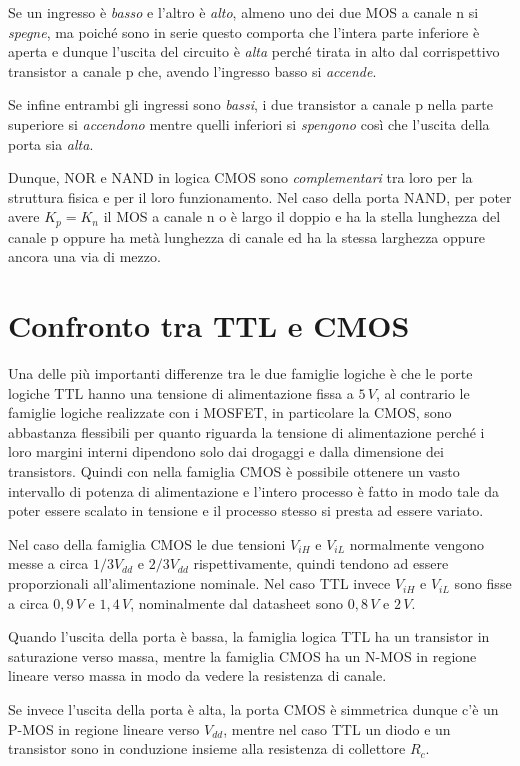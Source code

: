 \documentclass[12pt, a4paper]{report}
\begin{document}
Se un ingresso è \textit{basso} e l'altro è \textit{alto}, almeno uno dei due MOS a canale n si \textit{spegne}, ma poiché sono in serie questo comporta che l'intera parte inferiore è aperta e dunque l'uscita del circuito è \textit{alta} perché tirata in alto dal corrispettivo transistor a canale p che, avendo l'ingresso basso si \textit{accende}.

Se infine entrambi gli ingressi sono \textit{bassi}, i due transistor a canale p nella parte superiore si \textit{accendono} mentre quelli inferiori si \textit{spengono} così che l'uscita della porta sia \textit{alta}.

Dunque, NOR e NAND in logica CMOS sono \textit{complementari} tra loro per la struttura fisica e per il loro funzionamento. Nel caso della porta NAND, per poter avere $K_{p} = K_{n}$ il MOS a canale n o è largo il doppio e ha la stella lunghezza del canale p oppure ha metà lunghezza di canale ed ha la stessa larghezza oppure ancora una via di mezzo.

\section{Confronto tra TTL e CMOS}
Una delle più importanti differenze tra le due famiglie logiche è che le porte logiche TTL hanno una tensione di alimentazione fissa a $5\,V$, al contrario le famiglie logiche realizzate con i MOSFET, in particolare la CMOS, sono abbastanza flessibili per quanto riguarda la tensione di alimentazione perché i loro margini interni dipendono solo dai drogaggi e dalla dimensione dei transistors. Quindi con nella famiglia CMOS è possibile ottenere un vasto intervallo di potenza di alimentazione e l'intero processo è fatto in modo tale da poter essere scalato in tensione e il processo stesso si presta ad essere variato.

Nel caso della famiglia CMOS le due tensioni $V_{iH}$ e $V_{iL}$ normalmente vengono messe a circa $1/3V_{dd}$ e $2/3V_{dd}$ rispettivamente, quindi tendono ad essere proporzionali all'alimentazione nominale. Nel caso TTL invece $V_{iH}$ e $V_{iL}$ sono fisse a circa $0,9\,V$ e $1,4\,V$, nominalmente dal datasheet sono $0,8\,V$ e $2\,V$.

Quando l'uscita della porta è bassa, la famiglia logica TTL ha un transistor in saturazione verso massa, mentre la famiglia CMOS ha un N-MOS in regione lineare verso massa in modo da vedere la resistenza di canale.

Se invece l'uscita della porta è alta, la porta CMOS è simmetrica dunque c'è un P-MOS in regione lineare verso $V_{dd}$, mentre nel caso TTL un diodo e un transistor sono in conduzione insieme alla resistenza di collettore $R_c$.
\end{document}

